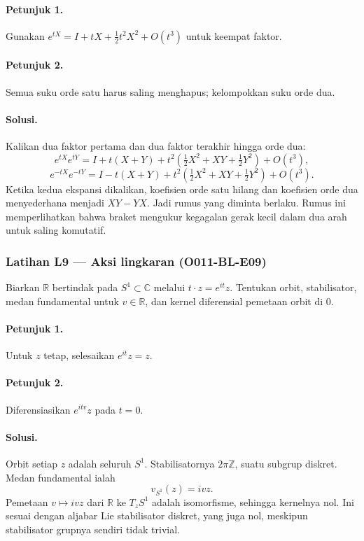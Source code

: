 \paragraph{Petunjuk 1.}
Gunakan $e^{tX}=I+tX+\tfrac12t^2X^2+O(t^3)$ untuk keempat faktor.

\paragraph{Petunjuk 2.}
Semua suku orde satu harus saling menghapus; kelompokkan suku orde dua.

\paragraph{Solusi.}
Kalikan dua faktor pertama dan dua faktor terakhir hingga orde dua:
\[
 e^{tX}e^{tY}
 =I+t(X+Y)+t^2\left(\tfrac12X^2+XY+\tfrac12Y^2\right)+O(t^3),
\]
\[
 e^{-tX}e^{-tY}
 =I-t(X+Y)+t^2\left(\tfrac12X^2+XY+\tfrac12Y^2\right)+O(t^3).
\]
Ketika kedua ekspansi dikalikan, koefisien orde satu hilang dan koefisien
orde dua menyederhana menjadi $XY-YX$. Jadi rumus yang diminta berlaku.
Rumus ini memperlihatkan bahwa braket mengukur kegagalan gerak kecil dalam
dua arah untuk saling komutatif.

\subsubsection*{Latihan L9 — Aksi lingkaran (O011-BL-E09)}
\label{o011-bl-e09}

Biarkan $\mathbb R$ bertindak pada $S^1\subset\mathbb C$ melalui
$t\cdot z=e^{it}z$. Tentukan orbit, stabilisator, medan fundamental untuk
$v\in\mathbb R$, dan kernel diferensial pemetaan orbit di $0$.

\paragraph{Petunjuk 1.}
Untuk $z$ tetap, selesaikan $e^{it}z=z$.

\paragraph{Petunjuk 2.}
Diferensiasikan $e^{itv}z$ pada $t=0$.

\paragraph{Solusi.}
Orbit setiap $z$ adalah seluruh $S^1$. Stabilisatornya
$2\pi\mathbb Z$, suatu subgrup diskret. Medan fundamental ialah
\[
 v_{S^1}(z)=ivz.
\]
Pemetaan $v\mapsto ivz$ dari $\mathbb R$ ke $T_zS^1$ adalah isomorfisme,
sehingga kernelnya nol. Ini sesuai dengan aljabar Lie stabilisator diskret,
yang juga nol, meskipun stabilisator grupnya sendiri tidak trivial.

